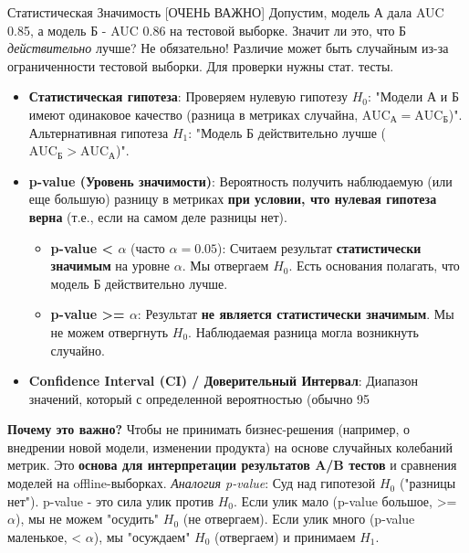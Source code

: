 \begin{alerttextbox}{Статистическая Значимость [ОЧЕНЬ ВАЖНО]}
    Допустим, модель А дала AUC 0.85, а модель Б - AUC 0.86 на тестовой выборке. Значит ли это, что Б \textit{действительно} лучше? Не обязательно! Различие может быть случайным из-за ограниченности тестовой выборки. Для проверки нужны стат. тесты.
    \begin{itemize}
        \item \textbf{Статистическая гипотеза}: Проверяем нулевую гипотезу $H_0$: "Модели А и Б имеют одинаковое качество (разница в метриках случайна, $\text{AUC}_А = \text{AUC}_Б$)". Альтернативная гипотеза $H_1$: "Модель Б действительно лучше ($\text{AUC}_Б > \text{AUC}_А$)".
        \item \textbf{p-value (Уровень значимости)}: Вероятность получить наблюдаемую (или еще большую) разницу в метриках \textbf{при условии, что нулевая гипотеза верна} (т.е., если на самом деле разницы нет).
            \begin{itemize}
                \item \textbf{p-value < $\alpha$} (часто $\alpha = 0.05$): Считаем результат \textbf{статистически значимым} на уровне $\alpha$. Мы отвергаем $H_0$. Есть основания полагать, что модель Б действительно лучше.
                \item \textbf{p-value >= $\alpha$}: Результат \textbf{не является статистически значимым}. Мы не можем отвергнуть $H_0$. Наблюдаемая разница могла возникнуть случайно.
            \end{itemize}
        \item \textbf{Confidence Interval (CI) / Доверительный Интервал}: Диапазон значений, который с определенной вероятностью (обычно 95%
    \end{itemize}
    \textbf{Почему это важно?} Чтобы не принимать бизнес-решения (например, о внедрении новой модели, изменении продукта) на основе случайных колебаний метрик. Это \textbf{основа для интерпретации результатов A/B тестов} и сравнения моделей на offline-выборках. %
    \textit{Аналогия p-value}: Суд над гипотезой $H_0$ ("разницы нет"). p-value - это сила улик против $H_0$. Если улик мало (p-value большое, >= $\alpha$), мы не можем "осудить" $H_0$ (не отвергаем). Если улик много (p-value маленькое, < $\alpha$), мы "осуждаем" $H_0$ (отвергаем) и принимаем $H_1$.
\end{alerttextbox}

